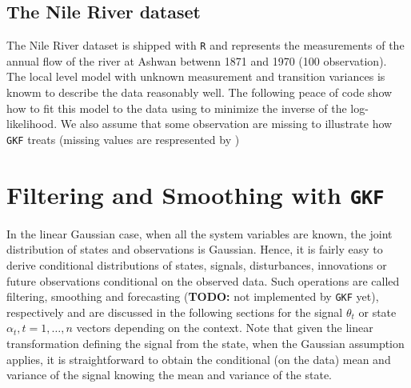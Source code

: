 \documentclass{article}
\newcommand{\R}{\texttt{R}\xspace}
\newcommand{\GKF}{\texttt{GKF}\xspace}
\begin{document}
\subsection{The Nile River dataset}
The Nile River dataset is shipped with \R and represents the measurements of the annual flow
of the river at Ashwan betwenn 1871 and 1970 (100 observation). The local level model with
unknown measurement and transition variances is knowm to describe the data reasonably
well. The following peace of code show how to fit this model to the data using \verb@optim@
to minimize the inverse of the log-likelihood. We also assume that some observation are
missing to illustrate how \GKF treats \verb@NA@ (missing values are respresented by
\verb@NA@)
\begin{Schunk}
\end{Schunk}


\section{Filtering and Smoothing with \GKF}
\label{sec:FilterSmoothing}

In the linear Gaussian case, when all the system variables are known, the joint distribution
of states and observations is Gaussian. Hence, it is fairly easy to derive conditional
distributions of states, signals, disturbances, innovations or future observations
conditional on the observed data. Such operations are called filtering, smoothing and
forecasting (\textbf{TODO:} not implemented by \GKF yet), respectively and are discussed in
the following sections for the signal $\theta_t$ or state $\alpha_t,t=1,\dots,n$ vectors
depending on the context. Note that given the linear transformation defining the signal from
the state, when the Gaussian assumption applies, it is straightforward to obtain the
conditional (on the data) mean and variance of the signal knowing the mean and variance of
the state.
\end{document}
